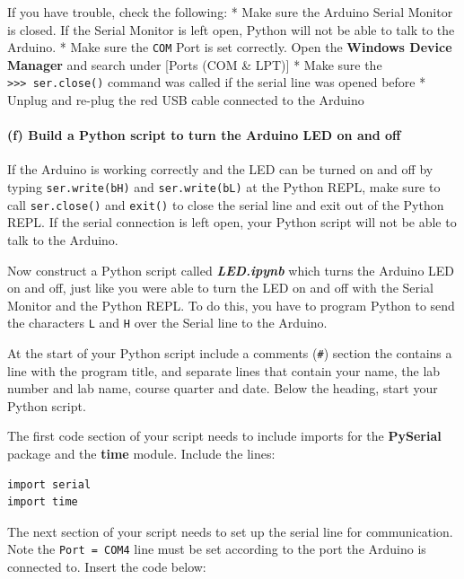 \documentclass[11pt]{article}
\begin{document}
If you have trouble, check the following: * Make sure the Arduino Serial
Monitor is closed. If the Serial Monitor is left open, Python will not
be able to talk to the Arduino. * Make sure the
\texttt{\textquotesingle{}COM\textquotesingle{}} Port is set correctly.
Open the \textbf{Windows Device Manager} and search under {[}Ports (COM
\& LPT){]} * Make sure the
\texttt{\textgreater{}\textgreater{}\textgreater{}\ ser.close()} command
was called if the serial line was opened before * Unplug and re-plug the
red USB cable connected to the Arduino

    \hypertarget{f-build-a-python-script-to-turn-the-arduino-led-on-and-off}{%
\paragraph{(f) Build a Python script to turn the Arduino LED on and
off}\label{f-build-a-python-script-to-turn-the-arduino-led-on-and-off}}

If the Arduino is working correctly and the LED can be turned on and off
by typing \texttt{ser.write(b\textquotesingle{}H\textquotesingle{})} and
\texttt{ser.write(b\textquotesingle{}L\textquotesingle{})} at the Python
REPL, make sure to call \texttt{ser.close()} and \texttt{exit()} to
close the serial line and exit out of the Python REPL. If the serial
connection is left open, your Python script will not be able to talk to
the Arduino.

Now construct a Python script called \textbf{\emph{LED.ipynb}} which
turns the Arduino LED on and off, just like you were able to turn the
LED on and off with the Serial Monitor and the Python REPL. To do this,
you have to program Python to send the characters \texttt{L} and
\texttt{H} over the Serial line to the Arduino.

    At the start of your Python script include a comments (\texttt{\#})
section the contains a line with the program title, and separate lines
that contain your name, the lab number and lab name, course quarter and
date. Below the heading, start your Python script.

The first code section of your script needs to include imports for the
\textbf{PySerial} package and the \textbf{time} module. Include the
lines:

\begin{verbatim}
import serial
import time
\end{verbatim}

The next section of your script needs to set up the serial line for
communication. Note the
\texttt{Port\ =\ \textquotesingle{}COM4\textquotesingle{}} line must be
set according to the port the Arduino is connected to. Insert the code
below:
\end{document}
